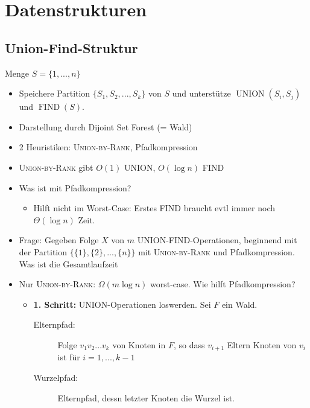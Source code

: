 \chapter{Datenstrukturen}
\section{Union-Find-Struktur}
\Geg Menge $S = \{1, ..., n\}$
\begin{itemize}
 \item Speichere Partition $\{S_1,S_2,...,S_k\}$ von $S$ und unterstütze $\operatorname{UNION}(S_i,S_j)$ und $\operatorname{FIND}(S)$.
 \item Darstellung durch Dijoint Set Forest (= Wald)
 \item 2 Heuristiken: \textsc{Union-by-Rank}, Pfadkompression
 \item \textsc{Union-by-Rank} gibt $O(1)$ UNION, $O(\log n)$ FIND
 \item Was ist mit Pfadkompression?
     \begin{itemize}
      \item Hilft nicht im Worst-Case: Erstes FIND braucht evtl immer noch $\Theta(\log n)$ Zeit.
     \end{itemize}
 \item Frage: Gegeben Folge $X$ von $m$ UNION-FIND-Operationen, beginnend mit der Partition $\{\{1\}, \{2\}, ..., \{n\}\}$ mit \textsc{Union-by-Rank} und Pfadkompression. Was ist die Gesamtlaufzeit
 \item Nur \textsc{Union-by-Rank}: $\Omega(m \log n)$ worst-case. Wie hilft Pfadkompression?
     \begin{itemize}
      \item \textbf{1. Schritt:} UNION-Operationen loswerden.
      \Defi Sei $F$ ein Wald.
          \begin{description}
           \item[Elternpfad:] Folge $v_1v_2...v_k$ von Knoten in $F$, so dass $v_{i+1}$ Eltern Knoten von $v_i$ ist für $i = 1,..., k-1$
           \item[Wurzelpfad:] Elternpfad, dessn letzter Knoten die Wurzel ist.
          \end{description}

\end{itemize}
\end{itemize}
